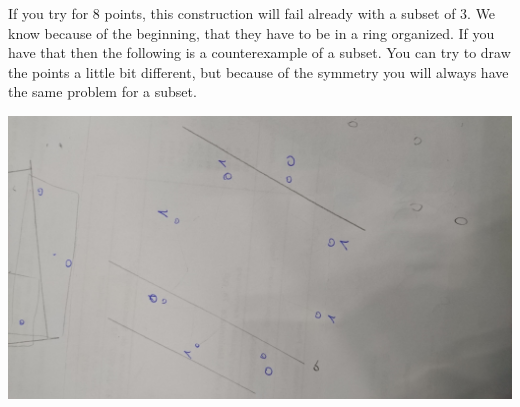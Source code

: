 \documentclass{article}
\begin{document}
If you try for 8 points, this construction will fail already with a subset of 3.
We know because of the beginning, that they have to be in a ring organized. If you
have that then the following is a counterexample of a subset. You can try to
draw the points a little bit different, but because of the symmetry you will
always have the same problem for a subset. 

\includegraphics[width=.6\linewidth]{22.jpg}
\end{document}
